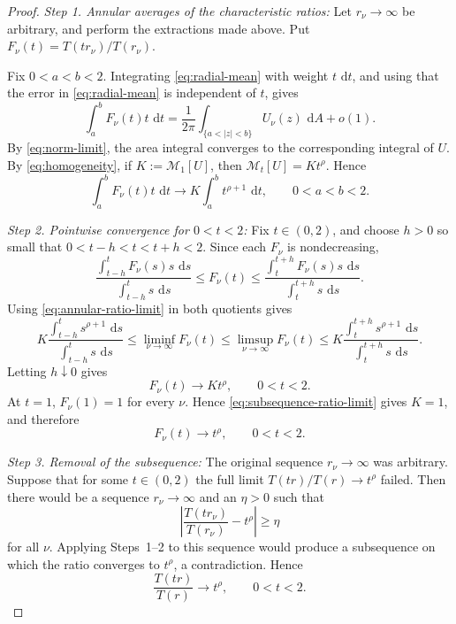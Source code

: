 \documentclass[12pt,letterpaper,reqno]{amsart}
\theoremstyle{definition}
\numberwithin{equation}{section}
\newcommand{\dd}{\,\mathrm d}
\newcommand{\dA}{\,\mathrm dA}
\newcommand{\mean}[2]{\mathcal M_{#1}\!\left[#2\right]}
\begin{document}
\begin{proof}

\medskip\noindent
\emph{{Step 1. Annular averages of the characteristic ratios:}}
Let \(r_\nu\to\infty\) be arbitrary, and perform the extractions made
above. Put
\(F_\nu(t)=T(tr_\nu)/T(r_\nu)\).

Fix \(0<a<b<2\). Integrating \eqref{eq:radial-mean} with weight
\(t\,\dd t\), and using that the error in
\eqref{eq:radial-mean} is independent of \(t\), gives
\[
\int_a^bF_\nu(t)t\,\dd t
=
\frac1{2\pi}
\int_{\{a<|z|<b\}}U_\nu(z)\,\dA
+
o(1).
\]
By \eqref{eq:norm-limit}, the area integral converges to the
corresponding integral of \(U\). By
\eqref{eq:homogeneity}, if
\(K:=\mean1U\), then \(\mean tU=Kt^\rho\). Hence
\begin{equation}\label{eq:annular-ratio-limit}
 \int_a^bF_\nu(t)t\,\dd t
 \longrightarrow
 K\int_a^bt^{\rho+1}\,\dd t,
 \qquad
 0<a<b<2.
\end{equation}


\medskip\noindent
\emph{{Step 2. Pointwise convergence for \(0<t<2\):}}
Fix \(t\in(0,2)\), and choose \(h>0\) so small that
\(0<t-h<t<t+h<2\).
Since each \(F_\nu\) is nondecreasing,
\[
\frac{\int_{t-h}^tF_\nu(s)s\,\dd s}
     {\int_{t-h}^ts\,\dd s}
\leq
F_\nu(t)
\leq
\frac{\int_t^{t+h}F_\nu(s)s\,\dd s}
     {\int_t^{t+h}s\,\dd s}.
\]
Using \eqref{eq:annular-ratio-limit} in both quotients gives
\[
K
\frac{\int_{t-h}^ts^{\rho+1}\,\dd s}
     {\int_{t-h}^ts\,\dd s}
\leq
\liminf_{\nu\to\infty}F_\nu(t)
\leq
\limsup_{\nu\to\infty}F_\nu(t)
\leq
K
\frac{\int_t^{t+h}s^{\rho+1}\,\dd s}
     {\int_t^{t+h}s\,\dd s}.
\]
Letting \(h\downarrow0\) gives
\begin{equation}\label{eq:subsequence-ratio-limit}
 F_\nu(t)\longrightarrow Kt^\rho,
 \qquad
 0<t<2.
\end{equation}
At \(t=1\), \(F_\nu(1)=1\) for every \(\nu\). Hence
\eqref{eq:subsequence-ratio-limit} gives \(K=1\), and therefore
\[
F_\nu(t)\longrightarrow t^\rho,
\qquad
0<t<2.
\]


\medskip\noindent
\emph{{Step 3. Removal of the subsequence:}}
The original sequence \(r_\nu\to\infty\) was arbitrary. Suppose that
for some \(t\in(0,2)\) the full limit
\(T(tr)/T(r)\to t^\rho\) failed. Then there would be a sequence
\(r_\nu\to\infty\) and an \(\eta>0\) such that
\[
\left|
\frac{T(tr_\nu)}{T(r_\nu)}
-
t^\rho
\right|
\geq\eta
\]
for all \(\nu\). Applying Steps~1--2 to this sequence would produce a
subsequence on which the ratio converges to \(t^\rho\), a
contradiction. Hence
\begin{equation}\label{eq:ratio-below-two}
 \frac{T(tr)}{T(r)}
 \longrightarrow t^\rho,
 \qquad
 0<t<2.
\end{equation}



\end{proof}
\end{document}
